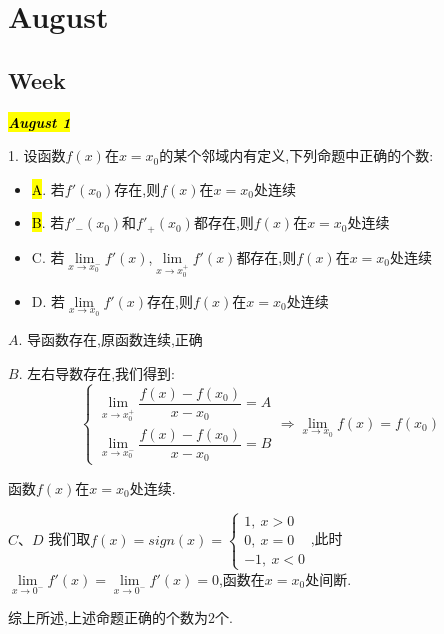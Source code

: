 \chapter{August}
\section{Week }
\hl{\textbf{\textit{August 1}}}

1. 设函数$f(x)$在$x=x_{0}$的某个邻域内有定义,下列命题中正确的个数:  
\begin{itemize}
	\item \hl{A}. 若$f'(x_{0})$存在,则$f(x)$在$x=x_{0}$处连续
	\item \hl{B}. 若$f'_{-}(x_{0})$和$f'_{+}(x_{0})$都存在,则$f(x)$在$x=x_{0}$处连续
	\item C. 若$\lim\limits_{x\rightarrow x_{0}^{-}}f'(x)$,$\lim\limits_{x\rightarrow x_{0}^{+}}f'(x)$都存在,则$f(x)$在$x=x_{0}$处连续
	\item D. 若$\lim\limits_{x\rightarrow x_{0}}f'(x)$存在,则$f(x)$在$x=x_{0}$处连续
\end{itemize}
\begin{solution}

	$A$. 导函数存在,原函数连续,正确
	
	$B$. 左右导数存在,我们得到:  
	$$\left\lbrace
	\begin{array}{l}
		\lim\limits_{x\rightarrow x_{0}^{+}}\dfrac{f(x)-f(x_{0})}{x-x_{0}}=A\\
		\lim\limits_{x\rightarrow x_{0}^{-}}\dfrac{f(x)-f(x_{0})}{x-x_{0}}=B
	\end{array}
	\right. \Rightarrow \lim\limits_{x\rightarrow x_{0}}f(x)=f(x_{0})$$
	
	函数$f(x)$在$x=x_{0}$处连续.
	
	$C\text{、}D$ 我们取$f(x)=sign(x)=\left\lbrace
	\begin{array}{l}
		1,\ x>0\\
		0,\ x=0\\
		-1,\ x<0
	\end{array}
	\right. $,此时$\lim\limits_{x\rightarrow 0^{-}}f'(x)=\lim\limits_{x\rightarrow 0^{-}}f'(x)=0$,函数在$x=x_{0}$处间断.
	
	综上所述,上述命题正确的个数为$2$个.
\end{solution}

